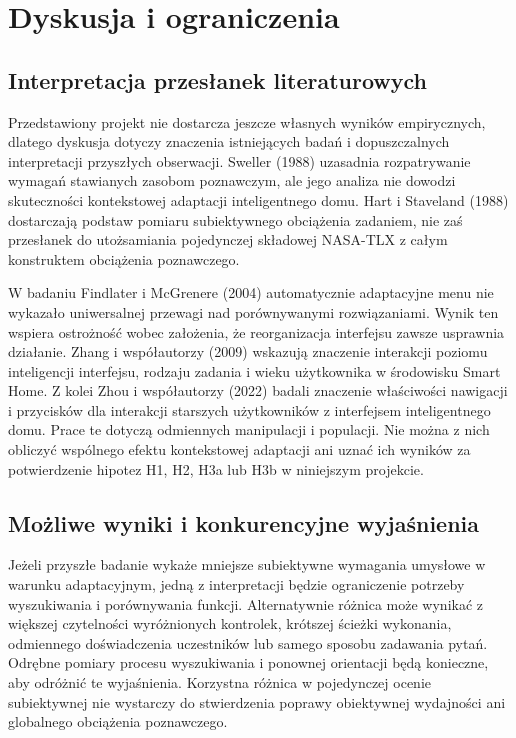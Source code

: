 \documentclass[11pt,a4paper]{article}
\begin{document}
\section{Dyskusja i ograniczenia}

\subsection{Interpretacja przesłanek literaturowych}

Przedstawiony projekt nie dostarcza jeszcze własnych wyników empirycznych, dlatego dyskusja dotyczy znaczenia istniejących badań i dopuszczalnych interpretacji przyszłych obserwacji. Sweller (1988) uzasadnia rozpatrywanie wymagań stawianych zasobom poznawczym, ale jego analiza nie dowodzi skuteczności kontekstowej adaptacji inteligentnego domu. Hart i Staveland (1988) dostarczają podstaw pomiaru subiektywnego obciążenia zadaniem, nie zaś przesłanek do utożsamiania pojedynczej składowej NASA-TLX z całym konstruktem obciążenia poznawczego.

W badaniu Findlater i McGrenere (2004) automatycznie adaptacyjne menu nie wykazało uniwersalnej przewagi nad porównywanymi rozwiązaniami. Wynik ten wspiera ostrożność wobec założenia, że reorganizacja interfejsu zawsze usprawnia działanie. Zhang i współautorzy (2009) wskazują znaczenie interakcji poziomu inteligencji interfejsu, rodzaju zadania i wieku użytkownika w środowisku Smart Home. Z kolei Zhou i współautorzy (2022) badali znaczenie właściwości nawigacji i przycisków dla interakcji starszych użytkowników z interfejsem inteligentnego domu. Prace te dotyczą odmiennych manipulacji i populacji. Nie można z nich obliczyć wspólnego efektu kontekstowej adaptacji ani uznać ich wyników za potwierdzenie hipotez H1, H2, H3a lub H3b w niniejszym projekcie.

\subsection{Możliwe wyniki i konkurencyjne wyjaśnienia}

Jeżeli przyszłe badanie wykaże mniejsze subiektywne wymagania umysłowe w warunku adaptacyjnym, jedną z interpretacji będzie ograniczenie potrzeby wyszukiwania i porównywania funkcji. Alternatywnie różnica może wynikać z większej czytelności wyróżnionych kontrolek, krótszej ścieżki wykonania, odmiennego doświadczenia uczestników lub samego sposobu zadawania pytań. Odrębne pomiary procesu wyszukiwania i ponownej orientacji będą konieczne, aby odróżnić te wyjaśnienia. Korzystna różnica w pojedynczej ocenie subiektywnej nie wystarczy do stwierdzenia poprawy obiektywnej wydajności ani globalnego obciążenia poznawczego.
\end{document}
